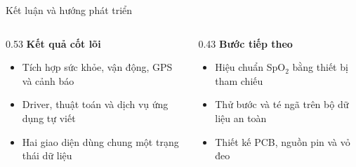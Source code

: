 \documentclass[aspectratio=169,11pt]{beamer}
\begin{document}
\begin{frame}{Kết luận và hướng phát triển}
  \begin{columns}[T,onlytextwidth]
    \begin{column}{0.53\textwidth}
      {\Large\bfseries Kết quả cốt lõi}\par\vspace{3mm}
      \begin{itemize}\setlength\itemsep{2.5mm}
        \item Tích hợp sức khỏe, vận động, GPS và cảnh báo
        \item Driver, thuật toán và dịch vụ ứng dụng tự viết
        \item Hai giao diện dùng chung một trạng thái dữ liệu
      \end{itemize}
    \end{column}
    \begin{column}{0.43\textwidth}
      {\Large\bfseries Bước tiếp theo}\par\vspace{3mm}
      \begin{itemize}\setlength\itemsep{2.5mm}
        \item Hiệu chuẩn SpO$_2$ bằng thiết bị tham chiếu
        \item Thử bước và té ngã trên bộ dữ liệu an toàn
        \item Thiết kế PCB, nguồn pin và vỏ đeo
      \end{itemize}
    \end{column}
  \end{columns}
  \vspace{5mm}\par
\end{frame}
\end{document}
